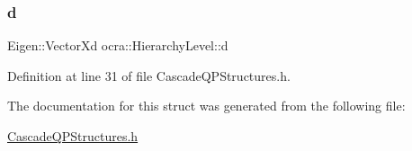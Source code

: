 \subsubsection{\texorpdfstring{d}{d}}
{\footnotesize\ttfamily Eigen\+::\+Vector\+Xd ocra\+::\+Hierarchy\+Level\+::d}



Definition at line 31 of file Cascade\+Q\+P\+Structures.\+h.



The documentation for this struct was generated from the following file\+:\begin{DoxyCompactItemize}
\item 
\hyperlink{CascadeQPStructures_8h}{Cascade\+Q\+P\+Structures.\+h}\end{DoxyCompactItemize}
